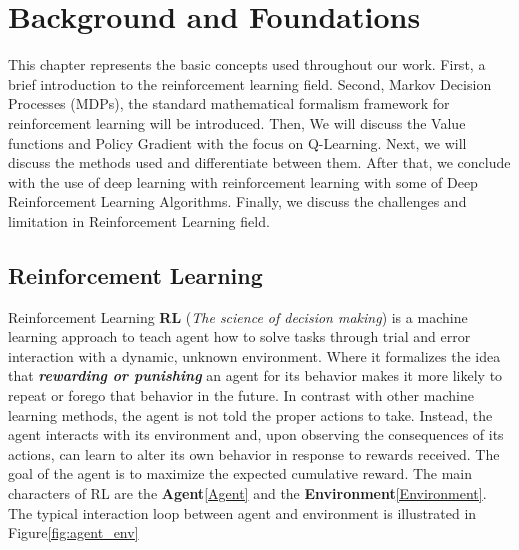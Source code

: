 
\chapter{Background and Foundations}\label{chapter:Background and Foundations}

This chapter represents the basic concepts used throughout our work. First, a brief introduction to the reinforcement learning field. Second, Markov Decision Processes (MDPs), the standard mathematical formalism framework for reinforcement learning will be introduced. Then, We will discuss the Value functions and Policy Gradient with the focus on Q-Learning. Next, we will discuss the methods used and differentiate between them. After that, we conclude with the use of deep learning with reinforcement learning with some of Deep Reinforcement Learning Algorithms. Finally, we discuss the challenges and limitation in Reinforcement Learning field.

\section{Reinforcement Learning}
Reinforcement Learning \textbf{RL} (\textit{The science of decision making}) is a machine learning approach to teach agent how to solve tasks through trial and error interaction with a dynamic, unknown environment. Where it formalizes the idea that \textit{\textbf{rewarding or punishing}} an agent for its behavior makes it more likely to repeat or forego that behavior in the future. In contrast with other machine learning methods, the agent is not told the proper actions to take. Instead, the agent interacts with its environment and, upon observing the consequences of its actions, can learn to alter its own behavior in response to rewards received. The goal of the agent is to maximize the expected cumulative reward. The main characters of RL are the \textbf{Agent}\ref{Agent} and the \textbf{Environment}\ref{Environment}. 
The typical interaction loop between agent and environment is illustrated in Figure\ref{fig:agent_env}

